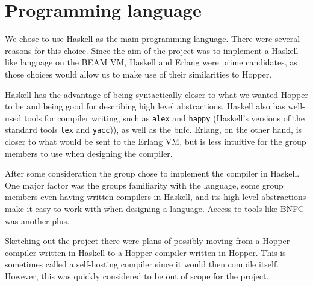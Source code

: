 \section{Programming language}



We chose to use Haskell as the main programming language. There were several reasons for this choice. Since the aim of the project was to implement a Haskell-like language on the BEAM VM, Haskell and Erlang were prime candidates, as those choices would allow us to make use of their similarities to Hopper.

Haskell has the advantage of being syntactically closer to what we wanted Hopper to be and being good for describing high level abstractions. Haskell also has well-used tools for compiler writing, such as \texttt{alex} and \texttt{happy} (Haskell's versions of the standard tools \texttt{lex}\cite{lex} and \texttt{yacc}\cite{yacc})), as well as the \gls{bnfc}. Erlang, on the other hand, is closer to what would be sent to the Erlang VM, but is less intuitive for the group members to use when designing the compiler.



After some consideration the group chose to implement the compiler in Haskell. One major factor was the groups familiarity with the language, some group members even having written compilers in Haskell, and its high level abstractions make it easy to work with when designing a language. Access to tools like BNFC was another plus.

Sketching out the project there were plans of possibly moving from a Hopper compiler written in Haskell to a Hopper compiler written in Hopper. This is sometimes called a self-hosting compiler since it would then compile itself. However, this was quickly considered to be out of scope for the project.
